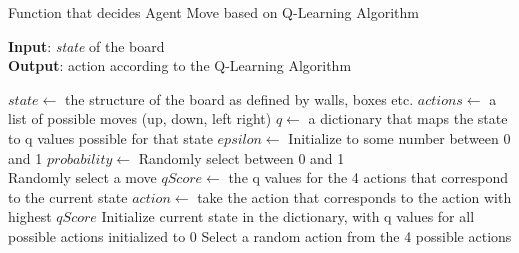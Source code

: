 \documentclass{article}
\begin{document}
\begin{algorithm}
    \caption{Function that decides Agent Move based on Q-Learning Algorithm}\label{euclid}
    \hspace*{\algorithmicindent} \textbf{Input}: \emph{state} of the board \\
    \hspace*{\algorithmicindent} \textbf{Output}: action according to the Q-Learning  Algorithm \\
    \begin{algorithmic}
    \State $state \gets$ the structure of the board as defined by walls, boxes etc.
    \State $actions \gets$ a list of possible moves (up, down, left right)
    \State $q \gets$ a dictionary that maps the state to q values possible for that state
    \State $epsilon \gets$ Initialize to some number between 0 and 1
    \State $probability \gets$ Randomly select between 0 and 1 \\
        \State Randomly select a move
    \Else
            \State $qScore \gets$ the q values for the 4 actions that correspond to the current state
            \State $action \gets$ take the action that corresponds to the action with highest $qScore$
        \Else
            \State Initialize current state in the dictionary, with q values for all possible actions initialized to 0
            \State Select a random action from the 4 possible actions
        \EndIf
    \EndIf 
    \end{algorithmic}
\end{algorithm}
\end{document}
